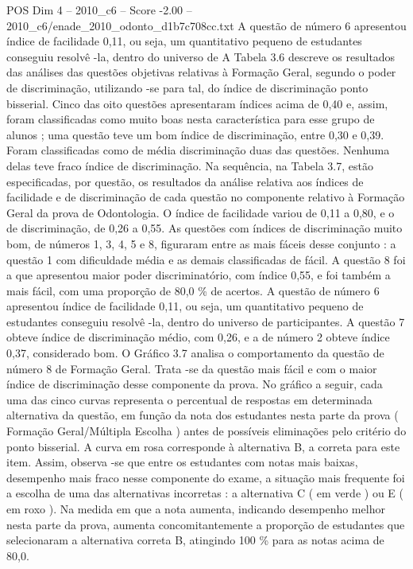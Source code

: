 \begin{textsample}{POS Dim 4 – 2010\_c6 – Score -2.00 – 2010\_c6/enade\_2010\_odonto\_d1b7c708cc.txt}
A questão de número 6 apresentou índice de facilidade 0,11, ou seja, um quantitativo pequeno de estudantes conseguiu resolvê -la, dentro do universo de A Tabela 3.6 descreve os resultados das análises das questões objetivas relativas à Formação Geral, segundo o poder de discriminação, utilizando -se para tal, do índice de discriminação ponto bisserial.
Cinco das oito questões apresentaram índices acima de 0,40 e, assim, foram classificadas como muito boas nesta característica para esse grupo de alunos ; uma questão teve um bom índice de discriminação, entre 0,30 e 0,39.
Foram classificadas como de média discriminação duas das questões.
Nenhuma delas teve fraco índice de discriminação.
Na sequência, na Tabela 3.7, estão especificadas, por questão, os resultados da análise relativa aos índices de facilidade e de discriminação de cada questão no componente relativo à Formação Geral da prova de Odontologia.
O índice de facilidade variou de 0,11 a 0,80, e o de discriminação, de 0,26 a 0,55.
As questões com índices de discriminação muito bom, de números 1, 3, 4, 5 e 8, figuraram entre as mais fáceis desse conjunto : a questão 1 com dificuldade média e as demais classificadas de fácil.
A questão 8 foi a que apresentou maior poder discriminatório, com índice 0,55, e foi também a mais fácil, com uma proporção de 80,0 \% de acertos.
A questão de número 6 apresentou índice de facilidade 0,11, ou seja, um quantitativo pequeno de estudantes conseguiu resolvê -la, dentro do universo de participantes.
A questão 7 obteve índice de discriminação médio, com 0,26, e a de número 2 obteve índice 0,37, considerado bom.
O Gráfico 3.7 analisa o comportamento da questão de número 8 de Formação Geral.
Trata -se da questão mais fácil e com o maior índice de discriminação desse componente da prova.
No gráfico a seguir, cada uma das cinco curvas representa o percentual de respostas em determinada alternativa da questão, em função da nota dos estudantes nesta parte da prova ( Formação Geral/Múltipla Escolha ) antes de possíveis eliminações pelo critério do ponto bisserial.
A curva em rosa corresponde à alternativa B, a correta para este item.
Assim, observa -se que entre os estudantes com notas mais baixas, desempenho mais fraco nesse componente do exame, a situação mais frequente foi a escolha de uma das alternativas incorretas : a alternativa C ( em verde ) ou E ( em roxo ).
Na medida em que a nota aumenta, indicando desempenho melhor nesta parte da prova, aumenta concomitantemente a proporção de estudantes que selecionaram a alternativa correta B, atingindo 100 \% para as notas acima de 80,0.

\end{textsample}
